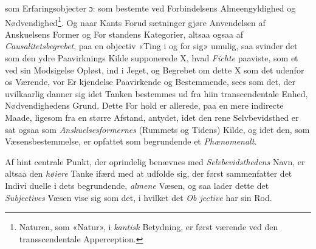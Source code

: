 som Erfaringsobjecter ɔ: som bestemte ved Forbindelsens
Almeengyldighed og Nødvendighed\footnote{Naturen, som «Natur», i \emph{kantisk} Betydning, er først værende
ved den transscendentale Apperception.}. Og naar Kants Forud\-%
sætninger gjøre Anvendelsen af Anskuelsens Former og For\-%
standens Kategorier, altsaa ogsaa af \emph{Causalitetsbegrebet},
paa en objectiv «Ting i og for sig» umulig, saa svinder det
som den ydre Paavirknings Kilde supponerede X, hvad \emph{Fichte}
paaviste, som et ved sin Modsigelse Opløst, ind i Jeget, og
Begrebet om dette X som det udenfor os Værende, vor Er\-%
kjendelse Paavirkende og Bestemmende, sees som det, der
uvilkaarlig danner sig idet Tanken bestemmes ud fra hiin
transcendentale Enhed, Nødvendighedens Grund. Dette For\-%
hold er allerede, paa en mere indirecte Maade, ligesom fra en
større Afstand, antydet, idet den rene Selvbevidsthed er sat
ogsaa som \emph{Anskuelsesformernes} (Rummets og Tidens)
Kilde, og idet den, som Væsensbestemmelse, er opfattet som
begrundende et \emph{Phænomenalt}.

Af hint centrale Punkt, der oprindelig benævnes med
\emph{Selvbevidsthedens} Navn, er altsaa den \emph{høiere} Tanke
ifærd med at udfolde sig, der først sammenfatter det Indivi\-%
duelle i dets begrundende, \emph{almene} Væsen, og saa lader dette
det \emph{Subjectives} Væsen vise sig som det, i hvilket det \emph{Ob\-%
jective} har sin Rod.

